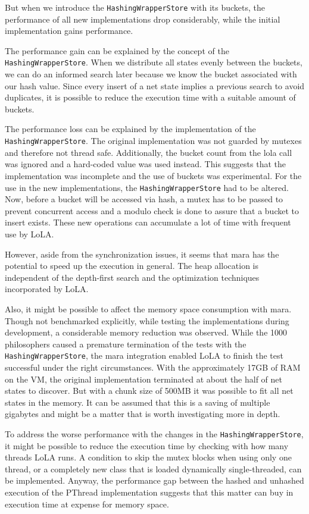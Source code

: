 But when we introduce the \texttt{Hashing\-Wrapper\-Store} with its buckets, the performance of all new implementations drop considerably, while the initial implementation gains performance. 

The performance gain can be explained by the concept of the \texttt{Hashing\-Wrapper\-Store}. When we distribute all states evenly between the buckets, we can do an informed search later because we know the bucket associated with our hash value. Since every insert of a net state implies a previous search to avoid duplicates, it is possible to reduce the execution time with a suitable amount of buckets.

The performance loss can be explained by the implementation of the \texttt{Hashing\-Wrapper\-Store}. The original implementation was not guarded by mutexes and therefore not thread safe. Additionally, the bucket count from the lola call was ignored and a hard-coded value was used instead. This suggests that the implementation was incomplete and the use of buckets was experimental. For the use in the new implementations, the \texttt{Hashing\-Wrapper\-Store} had to be altered. Now, before a bucket will be accessed via hash, a mutex has to be passed to prevent concurrent access and a modulo check is done to assure that a bucket to insert exists. These new operations can accumulate a lot of time with frequent use by LoLA.

However, aside from the synchronization issues, it seems that mara has the potential to speed up the execution in general. The heap allocation is independent of the depth-first search and the optimization techniques incorporated by LoLA. 

Also, it might be possible to affect the memory space consumption with mara. Though not benchmarked explicitly, while testing the implementations during development, a considerable memory reduction was observed. While the 1000 philosophers caused a premature termination of the tests with the \texttt{Hashing\-Wrapper\-Store}, the mara integration enabled LoLA to finish the test successful under the right circumstances. With the approximately 17GB of RAM on the VM, the original implementation terminated at about the half of net states to discover. But with a chunk size of 500MB it was possible to fit all net states in the memory. It can be assumed that this is a saving of multiple gigabytes and might be a matter that is worth investigating more in depth.

To address the worse performance with the changes in the \texttt{Hashing\-Wrapper\-Store}, it might be possible to reduce the execution time by checking with how many threads LoLA runs. A condition to skip the mutex blocks when using only one thread, or a completely new class that is loaded dynamically single-threaded, can be implemented. Anyway, the performance gap between the hashed and unhashed execution of the PThread implementation suggests that this matter can buy in execution time at expense for memory space.


